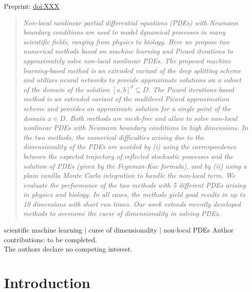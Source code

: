 \begin{center}
  Preprint: \href{https://XXX}{doi:XXX}\\
\end{center}

\begin{quote} %
  \small{\textit{
	Non-local nonlinear partial differential equations (PDEs) with Neumann boundary conditions are used to model dynamical processes in many scientific fields, ranging from physics to biology. Here we propose two numerical methods based on machine learning and Picard iterations to approximately solve non-local nonlinear PDEs. 
%
The proposed machine learning-based method is an extended variant of the deep splitting scheme and utilizes neural networks to provide approximate solutions on a subset of the domain of the solution $[a,b]^d \subseteq D$. 
%
The Picard iterations-based method is an extended variant of the multilevel Picard approximation scheme and provides an approximate solution for a single point of the domain $x \in D$. Both methods are mesh-free and allow to solve non-local nonlinear PDEs with Neumann boundary conditions in high dimensions.
%
In the two methods, the numerical difficulties arising due to the dimensionality of the PDEs are avoided by (i) using the correspondence between the expected trajectory of reflected stochastic processes and the solution of PDEs (given by the Feynman-Kac formula), and by (ii) using a plain vanilla Monte Carlo integration to handle the non-local term. 
%
We evaluate the performance of the two methods with 5 different PDEs arising in physics and biology.
%
In all cases, the methods yield good results in up to 10 dimensions with short run times.
%
Our work extends recently developed methods to overcome the curse of dimensionality in solving PDEs.
  }}
  \end{quote}
  scientific machine learning $|$ curse of dimensionality $|$ non-local PDEs
  \vskip12pt%
  \noindent \small{Author contributions: to be completed.\\
  The authors declare no competing interest.
  }
  
  \vspace{2cm}

\section{Introduction}

